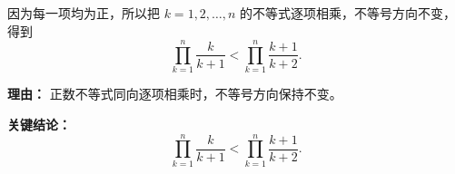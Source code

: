 \begin{examplebox}
\begin{description}[style=nextline, leftmargin=2.8em, labelsep=0.5em, itemsep=0.45em]
		\item[\textbf{第三步（逐项累乘）：}]
		      因为每一项均为正，所以把 $k=1,2,\ldots,n$ 的不等式逐项相乘，不等号方向不变，得到
		      \[
			      \prod_{k=1}^n\frac{k}{k+1}
			      <\prod_{k=1}^n\frac{k+1}{k+2}.
		      \]
		      \par\textbf{理由：} 正数不等式同向逐项相乘时，不等号方向保持不变。
	\end{description}

	\textbf{\textcolor{CExample}{关键结论：}}
	\[
		\boxed{\displaystyle\prod_{k=1}^n\frac{k}{k+1}<\prod_{k=1}^n\frac{k+1}{k+2}}.
	\]
\end{examplebox}